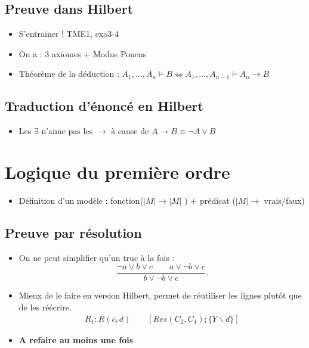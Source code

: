 \documentclass{article}
\theoremstyle{plain}%
\theoremstyle{definition}
\theoremstyle{remark}
\begin{document}
\subsection{Preuve dans Hilbert}
\begin{itemize}
    \item S'entrainer ! TME1, exo3-4
    \item On a : 3 axiomes + Modus Ponens
    \item Théorème de la déduction : $ A_1, \dots, A_n \models B \Leftrightarrow A_1, \dots, A_{n-1} \models A_n \to B$ 
\end{itemize}

\subsection{Traduction d'énoncé en Hilbert}
\begin{itemize}
    \item Les $ \exists  $ n'aime pas les $ \rightarrow  $ à cause de $ A \to B \equiv \neg A \vee B $
\end{itemize}

\section{Logique du première ordre}
\begin{itemize}
    \item Définition d'un modèle : fonction($ \left| M \right| \to \left| M \right|  $ ) + prédicat ($ \left| M \right| \to  $ vrais/faux)
\end{itemize}

\subsection{Preuve par résolution}
\begin{itemize}
    \item On ne peut simplifier qu'un truc à la fois : 
        \[
            \frac{\neg a \vee b \vee c \qquad a \vee \neg b \vee c }{b \vee \neg b \vee c}
        .\]
    \item Mieux de le faire en version Hilbert, permet de réutiliser les lignes plutôt que de les réécrire.
        \begin{align*}
            R_1 : R(c,d) \qquad [Res(C_2, C_4) ; \{Y\backslash d\}]
        \end{align*}
    \item \textbf{A refaire au moins une fois}
\end{itemize}
\end{document}
